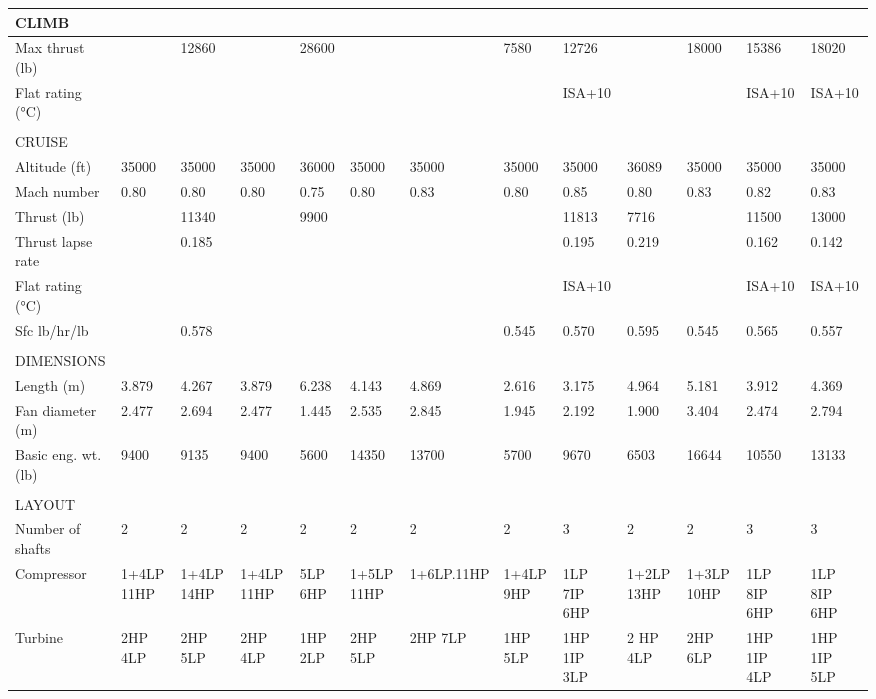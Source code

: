 \documentclass[12pt,a4paper]{report}
\begin{document}
\begin{landscape}
\begin{center}
\begin{longtable}{|p{1.5cm}|p{1.3cm}|p{1.1cm}|p{1.1cm}|p{1.1cm}|p{1.1cm}|p{1.1cm}|p{1.1cm}|p{1.1cm}|p{1.1cm}|p{1.1cm}|p{1.1cm}|p{1.1cm}|}
CLIMB	&		&		&		&		&		&		&		&		&		&		&		&		\\ \hline
Max thrust (lb)	&		&	12860	&		&	28600	&		&		&	7580	&	12726	&		&	18000	&	15386	&	18020	\\ \hline
Flat rating (°C)	&		&		&		&		&		&		&		&	ISA+10	&		&		&	ISA+10	&	ISA+10	\\ \hline
	&		&		&		&		&		&		&		&		&		&		&		&		\\ \hline
CRUISE	&		&		&		&		&		&		&		&		&		&		&		&		\\ \hline
Altitude (ft)	&	35000	&	35000	&	35000	&	36000	&	35000	&	35000	&	35000	&	35000	&	36089	&	35000	&	35000	&	35000	\\ \hline
Mach number	&	0.80	&	0.80	&	0.80	&	0.75	&	0.80	&	0.83	&	0.80	&	0.85	&	0.80	&	0.83	&	0.82	&	0.83	\\ \hline
Thrust (lb)	&		&	11340	&		&	9900	&		&		&		&	11813	&	7716	&		&	11500	&	13000	\\ \hline
Thrust lapse rate	&		&	0.185	&		&		&		&		&		&	0.195	&	0.219	&		&	0.162	&	0.142	\\ \hline
Flat rating (°C)	&		&		&		&		&		&		&		&	ISA+10	&		&		&	ISA+10	&	ISA+10	\\ \hline
Sfc lb/hr/lb	&		&	0.578	&		&		&		&		&	0.545	&	0.570	&	0.595	&	0.545	&	0.565	&	0.557	\\ \hline
	&		&		&		&		&		&		&		&		&		&		&		&		\\ \hline
DIMENSIONS	&		&		&		&		&		&		&		&		&		&		&		&		\\ \hline
Length (m)	&	3.879	&	4.267	&	3.879	&	6.238	&	4.143	&	4.869	&	2.616	&	3.175	&	4.964	&	5.181	&	3.912	&	4.369	\\ \hline
Fan diameter (m)	&	2.477	&	2.694	&	2.477	&	1.445	&	2.535	&	2.845	&	1.945	&	2.192	&	1.900	&	3.404	&	2.474	&	2.794	\\ \hline
Basic eng. wt. (lb)	&	9400	&	9135	&	9400	&	5600	&	14350	&	13700	&	5700	&	9670	&	6503	&	16644	&	10550	&	13133	\\ \hline
	&		&		&		&		&		&		&		&		&		&		&		&		\\ \hline
LAYOUT	&		&		&		&		&		&		&		&		&		&		&		&		\\ \hline
Number of shafts	&	2	&	2	&	2	&	2	&	2	&	2	&	2	&	3	&	2	&	2	&	3	&	3	\\ \hline
Compressor	&	1+4LP 11HP	&	1+4LP 14HP	&	1+4LP 11HP	&	5LP 6HP	&	1+5LP 11HP	&	1+6LP.11HP	&	1+4LP 9HP	&	1LP 7IP 6HP	&	1+2LP 13HP	&	1+3LP 10HP	&	1LP 8IP 6HP	&	1LP 8IP 6HP	\\ \hline
Turbine	&	2HP 4LP	&	2HP 5LP	&	2HP 4LP	&	1HP 2LP	&	2HP 5LP	&	2HP 7LP	&	1HP 5LP	&	1HP 1IP 3LP	&	2 HP 4LP	&	2HP 6LP	&	1HP 1IP 4LP	&	1HP 1IP 5LP	\\ \hline

\end{longtable}
\end{center}
\end{landscape}
\end{document}
